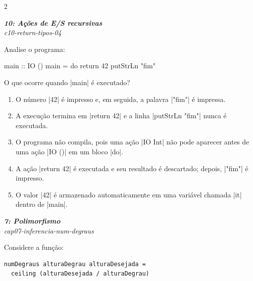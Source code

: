 \documentclass[a4paper,10pt,brazil]{article}
\begin{document}
\begin{multicols}{2}
\begin{flushright}
  \footnotesize
  \textit{\textbf{10: Ações de E/S recursivas}}\\
  \textit{c10-return-tipos-04}\\

\end{flushright}
Analise o programa:

\begin{haskellcode}
main :: IO ()
main = do
  return 42
  putStrLn "fim"
\end{haskellcode}

O que ocorre quando \haskellinline|main| é executado?

\begin{enumerate}
  \item O número \haskellinline|42| é impresso e, em seguida, a palavra \haskellinline|"fim"| é impressa.

  \item A execução termina em \haskellinline|return 42| e a linha \haskellinline|putStrLn "fim"| nunca é executada.

  \item O programa não compila, pois uma ação \haskellinline|IO Int| não pode aparecer antes de uma ação \haskellinline|IO ()| em um bloco \haskellinline|do|.

  \item A ação \haskellinline|return 42| é executada e seu resultado é descartado; depois, \haskellinline|"fim"| é impresso.

  \item O valor \haskellinline|42| é armazenado automaticamente em uma variável chamada \haskellinline|it| dentro de \haskellinline|main|.


\end{enumerate}

\begin{flushright}
  \footnotesize
  \textit{\textbf{7: Polimorfismo}}\\
  \textit{cap07-inferencia-num-degraus}\\

\end{flushright}
Considere a função:

\begin{verbatim}
numDegraus alturaDegrau alturaDesejada =
  ceiling (alturaDesejada / alturaDegrau)
\end{verbatim}


\end{multicols}
\end{document}
